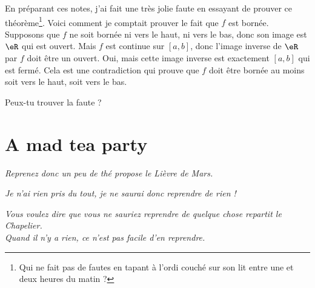 En préparant ces notes, j'ai fait une très jolie faute en essayant de prouver ce théorème\footnote{Qui ne fait pas de fautes en tapant à l'ordi couché sur son lit entre une et deux heures du matin ?}. Voici comment je comptait prouver le fait que $f$ est bornée. Supposons que $f$ ne soit bornée ni vers le haut, ni vers le bas, donc son image est $\eR$ qui est ouvert. Mais $f$ est continue sur $[a,b]$, donc l'image inverse de $\eR$ par $f$ doit être un ouvert. Oui, mais cette image inverse est exactement $[a,b]$ qui est fermé. Cela est une contradiction qui prouve que $f$ doit être bornée au moins soit vers le haut, soit vers le bas.

Peux-tu trouver la faute ?


\section{A mad tea party}	\label{PgMadTeaParty}

\textit{\og Reprenez donc un peu de thé\fg{} propose le Lièvre de Mars.}

\textit{\og Je n'ai rien pris du tout, je ne saurai donc reprendre de rien !\fg}

\textit{\og Vous voulez dire que vous ne sauriez reprendre de quelque chose\fg{} repartit le Chapelier.\\
 \og Quand il n'y a rien, ce n'est pas
facile d'en reprendre\fg.}

